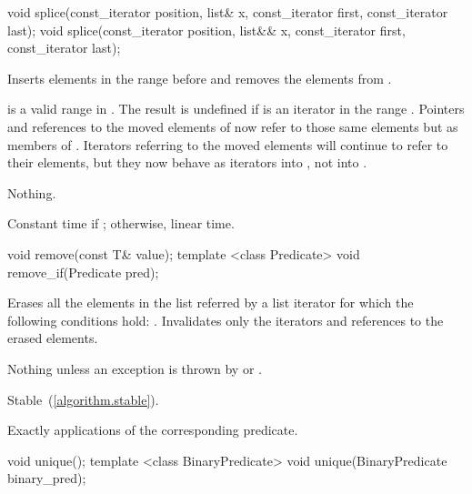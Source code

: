 %
%
\begin{itemdecl}
void splice(const_iterator position, list& x, const_iterator first,
            const_iterator last);
void splice(const_iterator position, list&& x, const_iterator first,
            const_iterator last);
\end{itemdecl}

\begin{itemdescr}
\pnum
\effects
Inserts elements in the range
before
and removes the elements from
.

\pnum
\requires
\tcode{[first, last)}
is a valid range in
.
The result is undefined if
is an iterator in the range
.
Pointers and references to the moved elements of
now refer to those same elements but as members of
.
Iterators referring to the moved elements will continue to refer to their
elements, but they now behave as iterators into
,
not into
.

\pnum
\throws Nothing.

\pnum
\complexity
Constant time if
;
otherwise, linear time.
\end{itemdescr}

%
\begin{itemdecl}
void remove(const T& value);
template <class Predicate> void remove_if(Predicate pred);
\end{itemdecl}

\begin{itemdescr}
\pnum
\effects
Erases all the elements in the list referred by a list iterator  for which the
following conditions hold: .
Invalidates only the iterators and references to the erased elements.

\pnum
\throws
Nothing unless an exception is thrown by
or
.

\pnum
\remarks Stable~(\ref{algorithm.stable}).

\pnum
\complexity
Exactly
applications of the corresponding predicate.
\end{itemdescr}

%
\begin{itemdecl}
void unique();
template <class BinaryPredicate> void unique(BinaryPredicate binary_pred);
\end{itemdecl}

